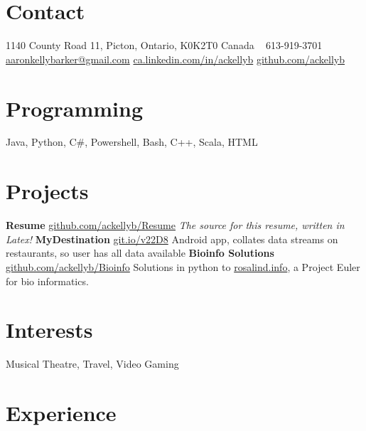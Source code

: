 \documentclass[]{friggeri-cv} %
\begin{document}



\begin{aside} %
	\section{Contact}
	1140 County Road 11, 
	Picton, Ontario,
	K0K2T0 Canada
	~
	613-919-3701
	~
	\href{mailto:aaron.kelly.barker@gmail.com}{aaronkellybarker@gmail.com}
	\href{ca.linkedin.com/in/ackellyb/}{ca.linkedin.com/in/ackellyb}
	\href{https://github.com/ackellyb}{github.com/ackellyb}
	~
	\section{Programming}
	Java, Python, C\#,
	Powershell, Bash, 
	C++, Scala, HTML
	~
	\section{Projects}
	\textbf{Resume}
	\href{https://github.com/ackellyb/Resume}{github.com/ackellyb/Resume}
	\emph{The source for this resume, written in Latex!}
	\textbf{MyDestination}
	\href{https://github.com/Nauscar/myDestination}{git.io/v22D8}
	Android app, collates data streams on restaurants, so user has all data available
	\textbf{Bioinfo Solutions}
	\href{https://github.com/ackellyb/Bioinfo}{github.com/ackellyb/Bioinfo}
	Solutions in python to \href{http://rosalind.info/}{rosalind.info}, a Project Euler for bio informatics. 
	~
	\section{Interests}
	Musical Theatre, Travel, 
	Video Gaming	
\end{aside}


\section{Experience}
\end{document}
